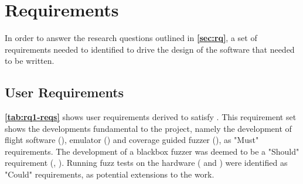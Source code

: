 \documentclass[../report.tex]{subfiles}
\begin{document}
\section{Requirements}
In order to answer the research questions outlined in
\textbf{\autoref{sec:rq}}, a set of requirements needed to identified to drive
the design of the software that needed to be written.

\subsection{User Requirements} \label{sec:user-req}

\textbf{\autoref{tab:rq1-reqs}} shows user requirements derived to satisfy
. This requirement set shows the developments fundamental to the
project, namely the development of flight software (), emulator
() and coverage guided fuzzer (), as "Must"
requirements. The development of a blackbox fuzzer was deemed to be a "Should"
requirement (, ). Running fuzz tests on the
hardware ( and ) were identified as "Could"
requirements, as potential extensions to the work.
\end{document}
